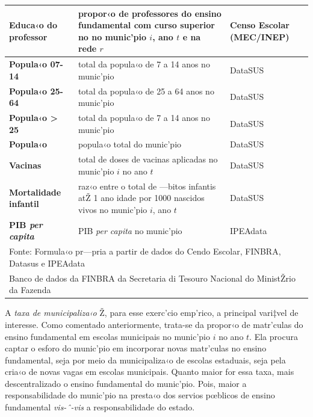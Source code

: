 \documentclass[a4paper, 12pt]{article}
\begin{document}
\begin{table}[htb]
\begin{footnotesize}
\begin{tabular}{ p{3cm} | p{9cm} | p{2cm}}
\hline
\bf{Educa‹o do professor} & propor‹o de professores do ensino fundamental com curso superior no no munic’pio $i$, ano $t$ e na rede $r$ & Censo Escolar (MEC/INEP)  \\
\hline
\bf{Popula‹o 07-14} & total da popula‹o de 7 a 14 anos no munic’pio & DataSUS  \\
\hline
\bf{Popula‹o 25-64} & total da popula‹o de 25 a 64 anos no munic’pio & DataSUS  \\
\hline
\bf{Popula‹o > 25} & total da popula‹o de 7 a 14 anos no munic’pio & DataSUS  \\
\hline
\bf{Popula‹o} &  popula‹o total do munic’pio & DataSUS  \\
\hline
\bf{Vacinas} & total de doses de vacinas aplicadas no munic’pio $i$ no ano $t$ & DataSUS  \\
\hline
\bf{Mortalidade infantil} & raz‹o entre o total de —bitos infantis atŽ 1 ano idade por 1000 nascidos vivos no munic’pio $i$, ano $t$ & DataSUS  \\
\hline
\bf{PIB \emph{per capita}} &  PIB \emph{per capita} no munic’pio & IPEAdata  \\
\hline
\bottomrule
\multicolumn{3}{l}{\footnotesize Fonte: Formula‹o pr—pria a partir de dados do Cendo Escolar, FINBRA, Datasus e IPEAdata}\\
\multicolumn{3}{l}{\footnotesize * Banco de dados da FINBRA da Secretaria di Tesouro Nacional do MinistŽrio da Fazenda}\\
\end{tabular}
\end{footnotesize}
\end{table}




A \emph{taxa de municipaliza‹o} Ž, para esse exerc’cio emp’rico, a principal vari‡vel de interesse. Como comentado anteriormente, trata-se da propor‹o de matr’culas do ensino fundamental em escolas municipais no munic’pio $i$ no ano $t$. Ela procura captar o esforo do munic’pio em incorporar novas matr’culas no ensino fundamental, seja por meio da municipaliza‹o de escolas estaduais, seja pela cria‹o de novas vagas em escolas municipais. Quanto maior for essa taxa, mais descentralizado o ensino fundamental do munic’pio. Pois, maior a responsabilidade do munic’pio na presta‹o dos servios pœblicos de ensino fundamental \emph{vis-ˆ-vis} a responsabilidade do estado.  
\end{document}

